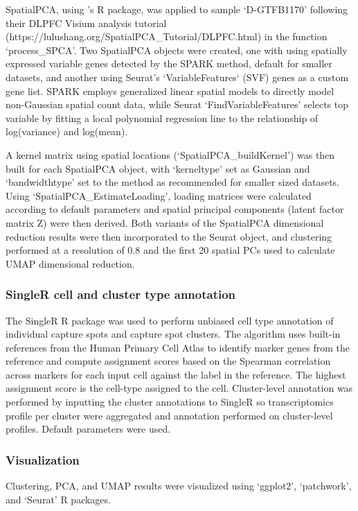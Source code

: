 \documentclass{article}
\begin{document}
SpatialPCA, using \citet{shang2022}'s R package, was applied to sample `D-GTFB1170' following their DLPFC Visium analysis tutorial (https://lulushang.org/SpatialPCA\_Tutorial/DLPFC.html) in the function `process\_SPCA'. Two SpatialPCA objects were created, one with using spatially expressed variable genes detected by the SPARK method\citep{sun_statistical_2020}, default for smaller datasets, and another using Seurat's `VariableFeatures` (SVF) genes as a custom gene list. SPARK employs generalized linear spatial models to directly model non-Gaussian spatial count data, while Seurat `FindVariableFeatures' selects top variable by fitting a local polynomial regression line to the relationship of log(variance) and log(mean).

A kernel matrix using spatial locations (`SpatialPCA\_buildKernel') was then built for each SpatialPCA object, with `kerneltype' set as Gaussian and `bandwidthtype' set to the \citet{sheather_reliable_1991a} method as recommended for smaller sized datasets. Using `SpatialPCA\_EstimateLoading', loading matrices were calculated according to default parameters and spatial principal components (latent factor matrix Z) were then derived. Both variants of the SpatialPCA dimensional reduction results were then incorporated to the Seurat object, and clustering performed at a resolution of 0.8 and the first 20 spatial PCs used to calculate UMAP dimensional reduction.

\subsubsection*{SingleR cell and cluster type annotation}

The SingleR\citep{aran_referencebased_2019} R package was used to perform unbiased cell type annotation of individual capture spots and capture spot clusters. The algorithm uses built-in references from the Human Primary Cell Atlas\citep{mabbott_expression_2013} to identify marker genes from the reference and compute assignment scores based on the Spearman correlation across markers for each input cell against the label in the reference. The highest assignment score is the cell-type assigned to the cell. Cluster-level annotation was performed by inputting the cluster annotations to SingleR so transcriptomics profile per cluster were aggregated and annotation performed on cluster-level profiles. Default parameters were used.

\subsubsection*{Visualization}
Clustering, PCA, and UMAP results were visualized using `ggplot2'\citep{wickham_ggplot2_2009}, `patchwork'\citep{pedersenthomasl_patchwork_2023}, and `Seurat'\citep{hao2021} R packages.
\end{document}
